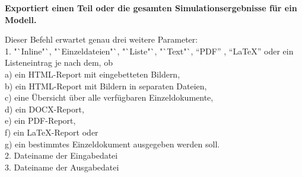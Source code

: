 \textbf{Exportiert einen Teil oder die gesamten Simulationsergebnisse für ein Modell.}

Dieser Befehl erwartet genau drei weitere Parameter:\\
1. "`Inline"`, "`Einzeldateien"`, "`Liste"`, "`Text"`, "`PDF"' , "`LaTeX"' oder ein Listeneintrag je nach dem, ob\\
a) ein HTML-Report mit eingebetteten Bildern,\\
b) ein HTML-Report mit Bildern in separaten Dateien,\\
c) eine Übersicht über alle verfügbaren Einzeldokumente,\\
d) ein DOCX-Report,\\
e) ein PDF-Report,\\
f) ein LaTeX-Report oder\\
g) ein bestimmtes Einzeldokument ausgegeben werden soll.\\
2. Dateiname der Eingabedatei\\
3. Dateiname der Ausgabedatei

